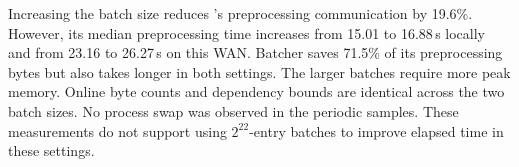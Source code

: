 Increasing the batch size reduces \ourprotocol's preprocessing communication by 19.6\%.
However, its median preprocessing time increases from 15.01 to 16.88\,s locally
and from 23.16 to 26.27\,s on this WAN.
Batcher saves 71.5\% of its preprocessing bytes but also takes longer in both settings.
The larger batches require more peak memory.
Online byte counts and dependency bounds are identical across the two batch sizes.
No process swap was observed in the periodic samples.
These measurements do not support using $2^{22}$-entry batches to improve elapsed time in these settings.
